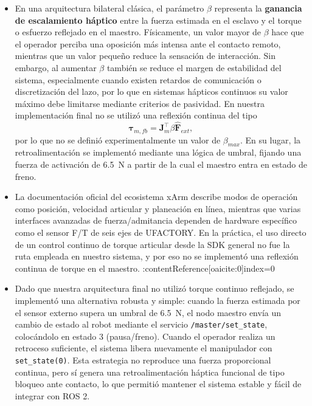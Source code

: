 \documentclass[journal,10pt,twoside]{IEEEtran}
\begin{document}
\begin{itemize}
    \item En una arquitectura bilateral clásica, el parámetro \(\beta\) representa la \textbf{ganancia de escalamiento háptico} entre la fuerza estimada en el esclavo y el torque o esfuerzo reflejado en el maestro. Físicamente, un valor mayor de \(\beta\) hace que el operador perciba una oposición más intensa ante el contacto remoto, mientras que un valor pequeño reduce la sensación de interacción. Sin embargo, al aumentar \(\beta\) también se reduce el margen de estabilidad del sistema, especialmente cuando existen retardos de comunicación o discretización del lazo, por lo que en sistemas hápticos continuos su valor máximo debe limitarse mediante criterios de pasividad. En nuestra implementación final no se utilizó una reflexión continua del tipo
    \[
      \bm{\tau}_{m,fb}=\bm{J}_m^\top \beta \hat{\bm{F}}_{ext},
    \]
    por lo que no se definió experimentalmente un valor de \(\beta_{max}\). En su lugar, la retroalimentación se implementó mediante una lógica de umbral, fijando una fuerza de activación de 6.5~N a partir de la cual el maestro entra en estado de freno.
    \\

    \item La documentación oficial del ecosistema xArm describe modos de operación como posición, velocidad articular y planeación en línea, mientras que varias interfaces avanzadas de fuerza/admitancia dependen de hardware específico como el sensor F/T de seis ejes de UFACTORY. En la práctica, el uso directo de un control continuo de torque articular desde la SDK general no fue la ruta empleada en nuestro sistema, y por eso no se implementó una reflexión continua de torque en el maestro. :contentReference[oaicite:0]{index=0}
    \\

    \item Dado que nuestra arquitectura final no utilizó torque continuo reflejado, se implementó una alternativa robusta y simple: cuando la fuerza estimada por el sensor externo supera un umbral de 6.5~N, el nodo maestro envía un cambio de estado al robot mediante el servicio \texttt{/master/set\_state}, colocándolo en estado 3 (pausa/freno). Cuando el operador realiza un retroceso suficiente, el sistema libera nuevamente el manipulador con \texttt{set\_state(0)}. Esta estrategia no reproduce una fuerza proporcional continua, pero sí genera una retroalimentación háptica funcional de tipo bloqueo ante contacto, lo que permitió mantener el sistema estable y fácil de integrar con ROS 2.
    \\


\end{itemize}
\end{document}
